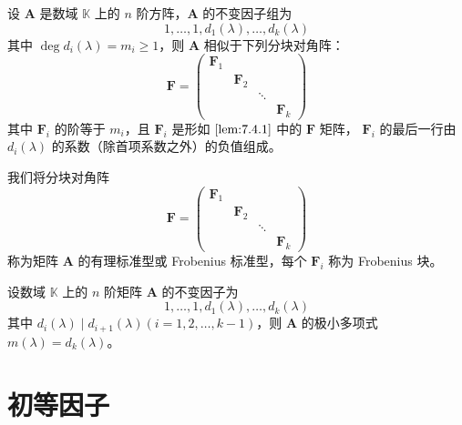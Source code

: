 \begin{theorem}
    设 $\bm{A}$ 是数域 $\mathbb{K}$ 上的 $n$ 阶方阵，$\bm{A}$ 的不变因子组为
    \[
        1, \ldots, 1, d_{1}(\lambda), \ldots, d_{k}(\lambda)
    \]
    其中 $\deg d_{i}(\lambda) = m_{i} \geqslant 1$，则 $\bm{A}$ 相似于下列分块对角阵：
    \begin{equation}
        \bm{F} = \begin{pmatrix}
            \bm{F}_{1} & \          & \                   \\
            \          & \bm{F}_{2} & \      & \          \\
            \          & \          & \ddots & \          \\
            \          & \          & \      & \bm{F}_{k}
        \end{pmatrix}\label{equ:7.4.4}
    \end{equation}
    其中 $\bm{F}_i$ 的阶等于 $m_i$，且 $\bm{F}_i$ 是形如 $\ref{lem:7.4.1}$ 中的 $\bm{F}$ 矩阵， $\bm{F}_i$ 的最后一行由 $d_{i}(\lambda)$ 的系数（除首项系数之外）的负值组成。
\end{theorem}

\begin{definition}
    我们将分块对角阵
    \begin{equation*}
        \bm{F} = \begin{pmatrix}
            \bm{F}_{1} & \          & \                   \\
            \          & \bm{F}_{2} & \      & \          \\
            \          & \          & \ddots & \          \\
            \          & \          & \      & \bm{F}_{k}
        \end{pmatrix}
    \end{equation*}
    称为矩阵 $\bm{A}$ 的有理标准型或 Frobenius 标准型，每个 $\bm{F}_i$ 称为 Frobenius 块。
\end{definition}

\begin{theorem}
    设数域 $\mathbb{K}$ 上的 $n$ 阶矩阵 $\bm{A}$ 的不变因子为
    \[
        1, \ldots, 1, d_{1}(\lambda), \ldots, d_{k}(\lambda)
    \]
    其中 $d_{i}(\lambda) \mid d_{i + 1}(\lambda)(i = 1, 2, \ldots, k - 1)$，则 $\bm{A}$ 的极小多项式 $m(\lambda) = d_{k}(\lambda)$。
\end{theorem}


\section{初等因子}

